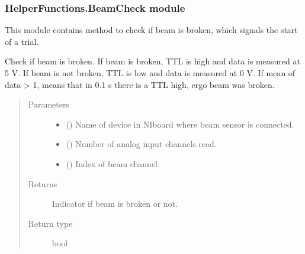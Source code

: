 \documentclass[letterpaper,10pt,english]{sphinxmanual}
\begin{document}
\subsubsection{HelperFunctions.BeamCheck module}
\label{\detokenize{NoSeMazeController/HelperFunctions:module-HelperFunctions.BeamCheck}}\label{\detokenize{NoSeMazeController/HelperFunctions:helperfunctions-beamcheck-module}}
\sphinxAtStartPar
This module contains method to check if beam is broken, which signals the start
of a trial.

\begin{fulllineitems}
\label{\detokenize{NoSeMazeController/HelperFunctions:HelperFunctions.BeamCheck.check_beam}}
\pysigstartsignatures
{}
\pysigstopsignatures
\sphinxAtStartPar
Check if beam is broken. If beam is broken, TTL is high and data is
measured at 5 V. If beam is not broken, TTL is low and data is measured at
0 V. If mean of data \textgreater{} 1, means that in 0.1 s there is a TTL high, ergo
beam was broken.
\begin{quote}\begin{description}
\item[{Parameters}] \leavevmode\begin{itemize}
\item {} 
\sphinxAtStartPar
{} () \textendash{} Name of device in NI\sphinxhyphen{}board where beam sensor is connected.

\item {} 
\sphinxAtStartPar
{} () \textendash{} Number of analog input channels read.

\item {} 
\sphinxAtStartPar
{} () \textendash{} Index of beam channel.

\end{itemize}

\item[{Returns}] \leavevmode
\sphinxAtStartPar
{} \textendash{} Indicator if beam is broken or not.

\item[{Return type}] \leavevmode
\sphinxAtStartPar
bool

\end{description}\end{quote}

\end{fulllineitems}
\end{document}
